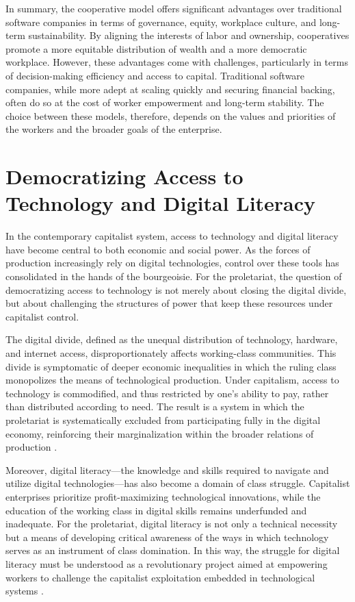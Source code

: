 \begin{refsection}
In summary, the cooperative model offers significant advantages over traditional software companies in terms of governance, equity, workplace culture, and long-term sustainability. By aligning the interests of labor and ownership, cooperatives promote a more equitable distribution of wealth and a more democratic workplace. However, these advantages come with challenges, particularly in terms of decision-making efficiency and access to capital. Traditional software companies, while more adept at scaling quickly and securing financial backing, often do so at the cost of worker empowerment and long-term stability. The choice between these models, therefore, depends on the values and priorities of the workers and the broader goals of the enterprise.

\section{Democratizing Access to Technology and Digital Literacy}

In the contemporary capitalist system, access to technology and digital literacy have become central to both economic and social power. As the forces of production increasingly rely on digital technologies, control over these tools has consolidated in the hands of the bourgeoisie. For the proletariat, the question of democratizing access to technology is not merely about closing the digital divide, but about challenging the structures of power that keep these resources under capitalist control.

The digital divide, defined as the unequal distribution of technology, hardware, and internet access, disproportionately affects working-class communities. This divide is symptomatic of deeper economic inequalities in which the ruling class monopolizes the means of technological production. Under capitalism, access to technology is commodified, and thus restricted by one's ability to pay, rather than distributed according to need. The result is a system in which the proletariat is systematically excluded from participating fully in the digital economy, reinforcing their marginalization within the broader relations of production \cite[pp.~125-127]{fuchscritical}.

Moreover, digital literacy—the knowledge and skills required to navigate and utilize digital technologies—has also become a domain of class struggle. Capitalist enterprises prioritize profit-maximizing technological innovations, while the education of the working class in digital skills remains underfunded and inadequate. For the proletariat, digital literacy is not only a technical necessity but a means of developing critical awareness of the ways in which technology serves as an instrument of class domination. In this way, the struggle for digital literacy must be understood as a revolutionary project aimed at empowering workers to challenge the capitalist exploitation embedded in technological systems \cite[pp.~95-97]{eubanksautomating}.


\end{refsection}
